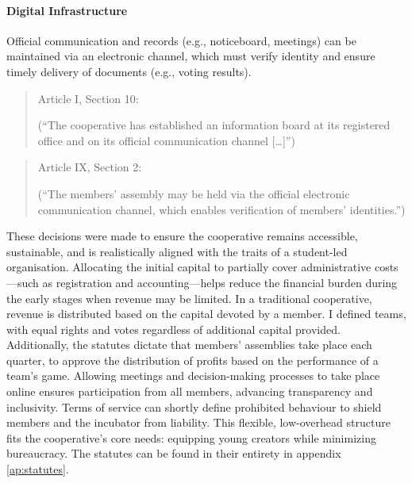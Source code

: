 \paragraph{Digital Infrastructure}
Official communication and records (e.g., noticeboard, meetings) can be maintained via an electronic channel, which must verify identity and ensure timely delivery of documents (e.g., voting results).
\begin{quote}
    Article I, Section 10: 

    (\enquote{The cooperative has established an information board at its registered office and on its official communication channel […]})
\end{quote}
\begin{quote}
    Article IX, Section 2: 

    (\enquote{The members’ assembly may be held via the official electronic communication channel, which enables verification of members’ identities.})
\end{quote}

These decisions were made to ensure the cooperative remains accessible, sustainable, and is realistically aligned with the traits of a student-led organisation. Allocating the initial capital to partially cover administrative costs---such as registration and accounting---helps reduce the financial burden during the early stages when revenue may be limited. In a traditional cooperative, revenue is distributed based on the capital devoted by a member. I defined teams, with equal rights and votes regardless of additional capital provided. Additionally, the statutes dictate that members’ assemblies take place each quarter, to approve the distribution of profits  based on the performance of a team’s game. Allowing meetings and decision-making processes to take place online ensures participation from all members, advancing transparency and inclusivity. Terms of service can shortly define prohibited behaviour to shield members and the incubator from liability. This flexible, low-overhead structure fits the cooperative's core needs: equipping young creators while minimizing bureaucracy. The statutes can be found in their entirety in appendix \ref{ap:statutes}.

